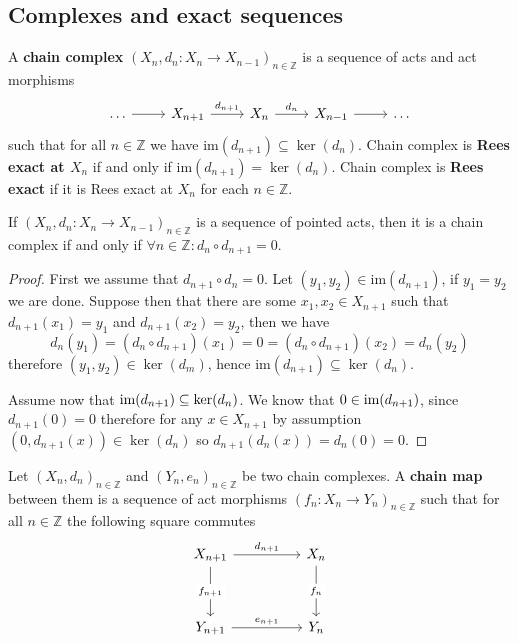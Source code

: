 \subsection{Complexes and exact sequences}
\begin{definition}
    A \textbf{chain complex} $(X_n, d_n: X_{n} \to X_{n-1})_{n\in\mathbb{Z}}$ is a sequence of acts and act morphisms
    \[\begin{tikzcd}
	\dots & {X_{n+1}} & {X_n} & {X_{n-1}} & \dots
	\arrow[from=1-1, to=1-2]
	\arrow["{d_{n+1}}", from=1-2, to=1-3]
	\arrow["{d_n}", from=1-3, to=1-4]
	\arrow[from=1-4, to=1-5]
\end{tikzcd}\]
    such that for all $n\in\mathbb{Z}$ we have $\text{im}(d_{n+1})\subseteq\ker(d_n)$. Chain
    complex is \textbf{Rees exact at $X_n$} if and only if $\text{im}(d_{n+1})=\ker(d_n)$.
    Chain complex is \textbf{Rees exact} if it is Rees exact at $X_n$ for each $n\in\mathbb{Z}$.
\end{definition}
\begin{remark}
    If $(X_n, d_n: X_{n} \to X_{n-1})_{n\in\mathbb{Z}}$ is a sequence of pointed acts, then
    it is a chain complex if and only if $\forall n\in\mathbb{Z} : d_n\circ d_{n+1} = 0$.
\end{remark}
\begin{proof}[Proof]
    First we assume that $d_{n+1}\circ d_n = 0$. Let $(y_1,y_2)\in\text{im}(d_{n+1})$, if 
    $y_1=y_2$ we are done. Suppose then that there are some $x_1,x_2\in X_{n+1}$ such that
    $d_{n+1}(x_1)=y_1$ and $d_{n+1}(x_2) = y_2$, then we have 
    \[
        d_n(y_1) = (d_n\circ d_{n+1})(x_1) = 0 = (d_n\circ d_{n+1})(x_2) = d_n(y_2)
    \]
    therefore $(y_1,y_2)\in\ker(d_m)$, hence $\text{im}(d_{n+1})\subseteq\ker(d_n)$.\par
    Assume now that $\text{im}(d_{n+1})\subseteq\ker(d_n)$. We know that $0\in\text{im}(d_{n+1})$, since
    $d_{n+1}(0) = 0$ therefore for any $x\in X_{n+1}$ by assumption $(0,d_{n+1}(x))\in\ker(d_n)$
    so $d_{n+1}(d_n(x)) = d_n(0) = 0$.
\end{proof}
\begin{definition}
    Let $(X_n, d_n)_{n\in\mathbb{Z}}$ and $(Y_n, e_n)_{n\in\mathbb{Z}}$ be two 
    chain complexes. A \textbf{chain map} between them is a sequence of act morphisms
    $(f_n: X_n\to Y_n)_{n\in\mathbb{Z}}$ such that for all $n\in\mathbb{Z}$ the following square commutes 
    \[\begin{tikzcd}
	{X_{n+1}} && {X_n} \\
	\\
	{Y_{n+1}} && {Y_n}
	\arrow["{d_{n+1}}", from=1-1, to=1-3]
	\arrow["{f_{n+1}}"{description}, from=1-1, to=3-1]
	\arrow["{f_n}"{description}, from=1-3, to=3-3]
	\arrow["{e_{n+1}}", from=3-1, to=3-3]
    \end{tikzcd}\]
\end{definition}
